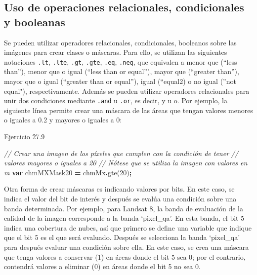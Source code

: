 \documentclass[
  12pt,
  letterpaper,
  twoside]{book}
\newenvironment{Shaded}{\begin{snugshade}}{\end{snugshade}}
\newcommand{\CommentTok}[1]{\textcolor[rgb]{0.56,0.35,0.01}{\textit{#1}}}
\newcommand{\DecValTok}[1]{\textcolor[rgb]{0.00,0.00,0.81}{#1}}
\newcommand{\FunctionTok}[1]{\textcolor[rgb]{0.00,0.00,0.00}{#1}}
\newcommand{\KeywordTok}[1]{\textcolor[rgb]{0.13,0.29,0.53}{\textbf{#1}}}
\newcommand{\NormalTok}[1]{#1}
\newcommand{\OperatorTok}[1]{\textcolor[rgb]{0.81,0.36,0.00}{\textbf{#1}}}
\begin{document}
\hypertarget{uso-de-operaciones-relacionales-condicionales-y-booleanas}{%
\subsection*{Uso de operaciones relacionales, condicionales y booleanas}\label{uso-de-operaciones-relacionales-condicionales-y-booleanas}}

Se pueden utilizar operadores relacionales, condicionales, booleanos sobre las imágenes para crear clases o máscaras. Para ello, se utilizan las siguientes notaciones \texttt{.lt}, \texttt{.lte}, \texttt{.gt}, \texttt{.gte}, \texttt{.eq}, \texttt{.neq}, que equivalen a menor que (``less than''), menor que o igual (``less than or equal''), mayor que (``greater than''), mayor que o igual (``greater than or equal''), igual (``equal2) o no igual (''not equal"), respectivamente. Además se pueden utilizar operadores relacionales para unir dos condiciones mediante \texttt{.and} u \texttt{.or}, es decir, y u o. Por ejemplo, la siguiente línea permite crear una máscara de las áreas que tengan valores menores o iguales a 0.2 y mayores o iguales a 0:

Ejercicio 27.9

\begin{Shaded}
\begin{Highlighting}[]
\CommentTok{// Crear una imagen de los píxeles que cumplen con la condición de tener }
\CommentTok{// valores mayores o iguales a 20}
\CommentTok{// Nótese que se utiliza la imagen con valores en m}
\KeywordTok{var}\NormalTok{ chmMXMask20 }\OperatorTok{=}\NormalTok{ chmMx}\OperatorTok{.}\FunctionTok{gte}\NormalTok{(}\DecValTok{20}\NormalTok{)}\OperatorTok{;}
\end{Highlighting}
\end{Shaded}

Otra forma de crear máscaras es indicando valores por bits. En este caso, se indica el valor del bit de interés y después se evalúa una condición sobre una banda determinada. Por ejemplo, para Landsat 8, la banda de evaluación de la calidad de la imagen corresponde a la banda `pixel\_qa'. En esta banda, el bit 5 indica una cobertura de nubes, así que primero se define una variable que indique que el bit 5 es el que será evaluado. Después se selecciona la banda `pixel\_qa' para después evaluar una condición sobre ella. En este caso, se crea una máscara que tenga valores a conservar (1) en áreas donde el bit 5 sea 0; por el contrario, contendrá valores a eliminar (0) en áreas donde el bit 5 no sea 0.
\end{document}
